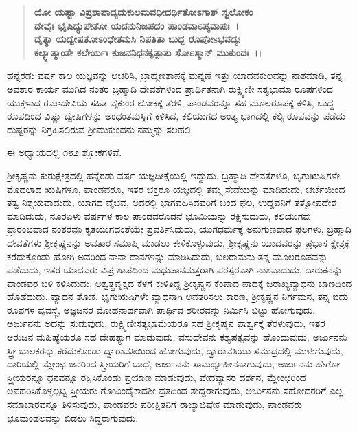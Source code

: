 \begin{verse}
\textbf{ಯೋ ಯಷ್ಟಾ ವಿಪ್ರಶಾಪಾದ್ಯದುಕುಲಮವಧೀದರ್ಥಿತೋಽಗಾತ್ ಸ್ವಲೋಕಂ}\\\textbf{ದೇವೈಃ ಭೈಷಿದ್ಯುಪೇತೋ ಯದನುನಿಜಪದಂ ಪಾಂಡವಾಽಪ್ಯವಾಪುಃ~।}\\\textbf{ದೈತ್ಯಾ ಯದ್ವೇಷತೋಽಂಧೇತಮಸಿ ನಿಪತಿತಾ ಬುದ್ದ ರೂಪೋsಭವದ್ಯಃ}\\\textbf{ಕಲ್ಕ್ಯಾತ್ಮಾಂತೇ ಕಲೇರ್ಯಃ ಕುಜನನಿಧನಕೃತ್ಪಾತು ಸೋಽಸ್ಮಾನ್ ಮುಕುಂದಃ~।।}
\end{verse}

ಹನ್ನೆರಡು ವರ್ಷ ಕಾಲ ಯಜ್ಞವನ್ನು ಆಚರಿಸಿ, ಬ್ರಾಹ್ಮಣಶಾಪಕ್ಕೆ ಮನ್ನಣೆ ಇತ್ತು ಯಾದವ\-ಕುಲವನ್ನು ನಾಶಮಾಡಿ, ತನ್ನ ಅವತಾರ ಕಾರ್ಯ ಮುಗಿದ ನಂತರ ಬ್ರಹ್ಮಾದಿ ದೇವತೆಗಳಿಂದ ಪ್ರಾರ್ಥಿತನಾಗಿ ರುಕ್ಷ್ಮಿಣೀ ಸತ್ಯಭಾಮಾ ರೂಪಗಳಿಂದ ಯುಕ್ತಳಾದ ರಮಾದೇವಿಯ ಸಹಿತ ವೈಕುಂಠ ಲೋಕಕ್ಕೆ ತೆರಳಿ, ಪಾಂಡವರನ್ನೂ ಸಹ ಮೂಲರೂಪಕ್ಕೆ ಕಳಿಸಿ, ಬುದ್ಧ ರೂಪದಿಂದ ವಿಷ್ಣು ದ್ವೇಷಿಗಳನ್ನು ಅಂಧಂತಮಸ್ಸಿಗೆ ಕಳಿಸಿದ, ಕಲಿಯುಗದ ಅಂತ್ಯ ಭಾಗದಲ್ಲಿ ಕಲ್ಕಿ ರೂಪವನ್ನು ಪಡೆದು ದುಷ್ಟರನ್ನು ನಿಗ್ರಹಿಸಲಿರುವ ಶ‍್ರೀಮುಕುಂದನು ನಮ್ಮನ್ನು ಸಲಹಲಿ.

ಈ ಅಧ್ಯಾಯದಲ್ಲಿ ೧೮೨ ಶ್ಲೋಕಗಳಿವೆ.

ಶ‍್ರೀಕೃಷ್ಣನು ಕುರುಕ್ಷೇತ್ರದಲ್ಲಿ ಹನ್ನೆರಡು ವರ್ಷ ಯಜ್ಞದೀಕ್ಷೆಯಲ್ಲಿ ಇದ್ದುದು, ಬ್ರಹ್ಮಾದಿ ದೇವತೆಗಳೂ, ಬೃಗುಋಷಿಗಳೇ ಮೊದಲಾದ ಋಷಿಗಳೂ, ಪಾಂಡವರೂ, ಇತರ ಭಕ್ತರೂ ಯಜ್ಞದಲ್ಲಿ ತಮ್ಮ ಸೇವೆಯನ್ನು ಮಾಡಿದುದು, ಚರ್ಚೆಯಿಂದ ತತ್ವ ನಿಶ್ಚಯವಾದುದು, ಯಾಗದ ವೈಭವ, ಅದರಲ್ಲಿ ಭಾಗವಹಿಸಿದವರಿಗೆ ಬಂದ ಫಲ, ಉದ್ದವನಿಗೆ ತತ್ವೋಪದೇಶ ಮಾಡಿದುದು, ನೂರಏಳು ವರ್ಷಗಳ ಕಾಲ ಪಾಂಡವರೊಡನೆ ಭೂಮಿಯನ್ನು ರಕ್ಷಿಸುದುದು, ಕಲಿಯುಗವು ಪ್ರಾರಂಭವಾದ ನಂತರವೂ ಕೃತಯುಗದಂತೆಯೇ ಪ್ರವರ್ತಿಸಿದುದು, ಯುಗಧರ್ಮಕ್ಕೆ ಅನುಗುಣವಾದ ಫಲಗಳು, ಬ್ರಹ್ಮಾದಿ ದೇವತೆಗಳು ಶ‍್ರೀಕೃಷ್ಣನನ್ನು ಅವತಾರ ಸಮಾಪ್ತಿ ಮಾಡಲು ಕೇಳಿಕೊಳ್ಳುವುದು, ಶ‍್ರೀಕೃಷ್ಣನು ಯಾದವರನ್ನು ಪ್ರಭಾಸ ಕ್ಷೇತ್ರಕ್ಕೆ ಕರೆದುಕೊಂಡು ಹೋಗಿ ಅವರಿಂದ ನಾನಾ ದಾನಗಳನ್ನು ಮಾಡಿಸಿದುದು, ಬಲರಾಮನು ತನ್ನ ಮೂಲರೂಪವನ್ನು ಪಡೆದುದು, ಇತರ ಯಾದವರು ವಿಪ್ರ ಶಾಪದಿಂದ ಮಧುಪಾನಮತ್ತರಾಗಿ ಪರಸ್ಪರವಾಗಿ ನಾಶವಾದುದು, ದಾರುಕನನ್ನು ಪಾಂಡವರ ಬಳಿ ಕಳಿಸಿದುದು, ಅಶ್ವತ್ಥವೃಕ್ಷದ ಕೆಳಗೆ ಕುಳಿತಿದ್ದ ಶ‍್ರೀಕೃಷ್ಣನ ಕೆಂಪಾದ ಪಾದಕ್ಕೆ ಜರಾಖ್ಯವ್ಯಾಧನು ಬಾಣದಿಂದ ಹೊಡೆದುದು, ವ್ಯಾಧನ ಶೋಕ, ಭೃಗುಋಷಿಗಳೇ ವ್ಯಾಧನಾಗಿ ಅವತರಿಸಲು ಕಾರಣ, ಶ‍್ರೀಕೃಷ್ಣನ ನಿರ್ಗಮನ, ತನ್ನ ಐದು ರೂಪಗಳ ವ್ಯವಸ್ಥೆ, ಅಜ್ಞಜನರ ಮೋಹನಾರ್ಥವಾಗಿ ಪಾರ್ಥಿವ ಶರೀರವನ್ನು ನಿರ್ಮಿಸಿ ಬಿಟ್ಟು ಹೋಗುವುದು, ಅರ್ಜುನನು ಅದನ್ನು ಸುಡುವುದು, ರುಕ್ಷ್ಮಿಣೀ\break ಸತ್ಯಭಾಮೆಯರೂ ಸಹ ಶ‍್ರೀಕೃಷ್ಣನ ಪಾರ್ಶ್ವಕ್ಕೆ ತೆರಳುವುದು, ಇತರ ಆರುಜನ ಮಹಿಷ್ಯೆ\-ಯರೂ ಸಹ ದೇಹತ್ಯಾಗ ಮಾಡುವುದು, ವಸುದೇವನು ಕಶ್ಯಪತ್ವವನ್ನು ಹೊಂದುವುದು, ಅರ್ಜುನನು ಸ್ತ್ರೀ ಬಾಲಕರನ್ನು ಕರೆದುಕೊಂಡು ದ್ವಾರಾವತಿಯಿಂದ ಹೋಗುವುದು, ದ್ವಾರಾ\-ವತಿಯು ಸಮುದ್ರದಲ್ಲಿ ಮುಳುಗುವುದು, ದಾರಿಯಲ್ಲಿ ಮ್ಲೇಂಛ ಜನರಿಂದ ಸ್ತ್ರೀಯರಿಗೆ ಬಾಧೆ, ಅರ್ಜುನನು ಸಾಮರ್ಥ್ಯಹೀನನಾಗುವುದು, ಅರ್ಜುನನು ಹೇಗೋ ಸ್ತ್ರೀಯರನ್ನೂ ಧನವನ್ನೂ ರಕ್ಷಿಸಿಕೊಂಡು ಪ್ರಯಾಣ ಮಾಡುವುದು, ವೇದವ್ಯಾಸರ ದರ್ಶನ, ಮ್ಲೇಂಛರಿಂದ ಅಪಹರಿಸಿಕೊಳ್ಳಲ್ಪಟ್ಟ ಸ್ತ್ರೀಯರು ಗೋವಿಂದೈಕಾದಶೀ ವ್ರತದಿಂದ ಶುದ್ದರಾಗುವುದು, ಅರ್ಜುನನು ಸಹೋದರರಿಗೆ ಎಲ್ಲ ಸಮಾಚಾರವನ್ನೂ ತಿಳಿಸುವುದು, ಪಾಂಡವರು ಪರೀಕ್ಷಿತನಿಗೆ ರಾಜ್ಯಾಭಿಷೇಕ ಮಾಡುವುದು, ಪಾಂಡವರು ಭೂಮಂಡಲವನ್ನು ಬಿಡಲು ಸಿದ್ಧರಾಗುವುದು.

